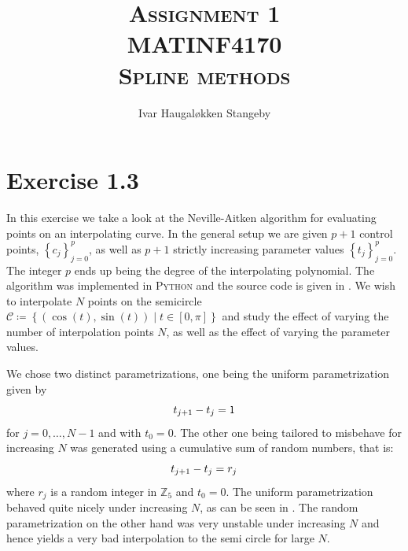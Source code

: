 \documentclass{article}
\title{\textsc{Assignment 1 \\ MATINF4170 \\ Spline methods}}
\author{Ivar Haugal{\o}kken Stangeby}
\begin{document}
    \maketitle

    \section*{Exercise 1.3}
    \label{sec:exercise_1_3}
    
    In this exercise we take a look at the Neville-Aitken algorithm for
    evaluating points on an interpolating curve. In the general setup we are
    given $p+1$ control points, $\left\{ c_j \right\}_{j=0}^p$, as well as
    $p+1$ strictly increasing parameter values $\left\{ t_j \right\}_{j=0}^p$.
    The integer $p$ ends up being the degree of the interpolating polynomial.
    The algorithm was implemented in \textsc{Python} and the source code is
    given in .  We wish to interpolate $N$ points on the
    semicircle $\mathcal{C} \coloneqq \left\{ \left( \cos(t), \sin(t) \right)
    \mid t \in [0, \pi]\right\}$ and study the effect of varying the number of
    interpolation points $N$, as well as the effect of varying the parameter
    values. 
   
    We chose two distinct parametrizations, one being the uniform
    parametrization given by
    \begin{equation}
        \notag
        t_{j+1} - t_j = 1
    \end{equation}
    for $j = 0, \ldots, N-1$ and with $t_0 = 0$. The other one being tailored
    to misbehave for increasing $N$ was generated using a cumulative sum of
    random numbers, that is:
    \begin{equation}
        \notag
        t_{j+1} - t_j = r_j
    \end{equation}
    where $r_j$ is a random integer in $\mathbb{Z}_5$ and $t_0 = 0$.  The
    uniform parametrization behaved quite nicely under increasing $N$, as can
    be seen in .  The random parametrization on the other
    hand was very unstable under increasing $N$ and hence yields a very bad
    interpolation to the semi circle for large $N$.
\end{document}
